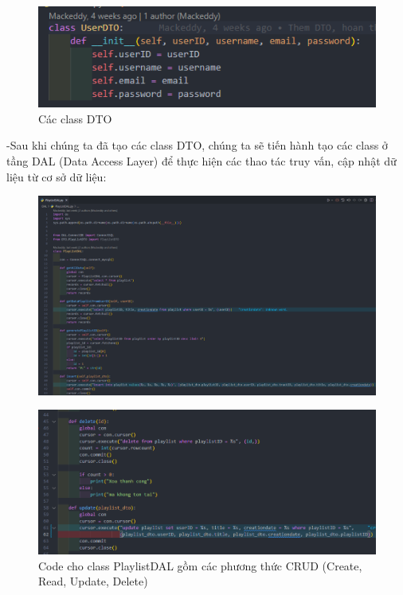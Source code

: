 \documentclass[a4paper]{article}
\begin{document}
\newpage
\begin{flushleft}
	\begin{figure}[h]
		\includegraphics[width=\textwidth]{images/UserDTO.png}
		\caption{Các class DTO}
	\end{figure}
	-Sau khi chúng ta đã tạo các class DTO, chúng ta sẽ tiến hành tạo các class ở tầng DAL (Data Access Layer) để thực hiện các thao tác truy vấn, cập nhật dữ liệu từ cơ sở dữ liệu:
\end{flushleft}
\begin{figure}[h]
	\centering
	\includegraphics[width=\textwidth]{images/PlaylistDAL-1.png}
\end{figure}
\begin{figure}
	\includegraphics[width=\textwidth]{images/PlaylistDAL-2.png}
	\caption{Code cho class PlaylistDAL gồm các phương thức CRUD (Create, Read, Update, Delete)}
\end{figure}
\end{document}
